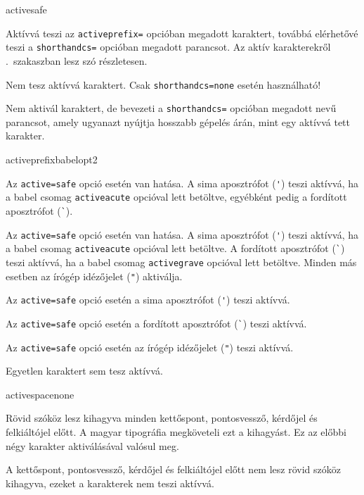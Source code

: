 \documentclass[12pt]{article}
\begin{document}
\begin{description}

\begin{hunopt}{active}{safe}
\item[safe]
Aktívvá teszi az \texttt{activeprefix=} opcióban megadott karaktert, továbbá elérhetővé teszi a \texttt{shorthandcs=} opcióban megadott parancsot.
Az aktív karakterekről .~szakaszban lesz szó részletesen. 
\item[none]
Nem tesz aktívvá karaktert.
Csak \texttt{shorthandcs=none} esetén használható!
\item[onlycs]
Nem aktivál karaktert, de bevezeti a \texttt{shorthandcs=} opcióban megadott nevű parancsot, amely ugyanazt nyújtja hosszabb gépelés árán, mint egy aktívvá tett karakter.
\end{hunopt}

\begin{hunopt}{activeprefix}{babelopt2}
\item[babelopt2]
Az \texttt{active=safe} opció esetén van hatása.
A sima aposztrófot (\verb|'|) teszi aktívvá, ha a \textsf{babel} csomag \texttt{activeacute} opcióval lett betöltve, egyébként pedig a fordított aposztrófot (\verb|`|).
\item[babelopt3]
Az \texttt{active=safe} opció esetén van hatása.
A sima aposztrófot (\verb|'|) teszi aktívvá, ha a \textsf{babel} csomag \texttt{activeacute} opcióval lett betöltve.
A fordított aposztrófot (\verb|`|) teszi aktívvá, ha a \textsf{babel} csomag \texttt{activegrave} opcióval lett betöltve.
Minden más esetben az írógép idézőjelet (\verb|"|) aktiválja.
\item[acute]
Az \texttt{active=safe} opció esetén a sima aposztrófot (\verb|'|) teszi aktívvá.
\item[grave]
Az \texttt{active=safe} opció esetén a fordított aposztrófot (\verb|`|) teszi aktívvá.
\item[quotedbl]
Az \texttt{active=safe} opció esetén az írógép idézőjelet (\verb|"|) teszi aktívvá.
\item[none]
Egyetlen karaktert sem tesz aktívvá.
\end{hunopt}

\begin{hunopt}{activespace}{none}
\item[safe]
Rövid szóköz lesz kihagyva minden kettőspont, pontosvessző, kérdőjel és felkiáltójel előtt.
A magyar tipográfia megköveteli ezt a kihagyást.
Ez az előbbi négy karakter aktiválásával valósul meg.
\item[none]
A kettőspont, pontosvessző, kérdőjel és felkiáltójel előtt nem lesz rövid szóköz kihagyva, ezeket a karakterek nem teszi aktívvá.
\end{hunopt}


\end{description}
\end{document}
